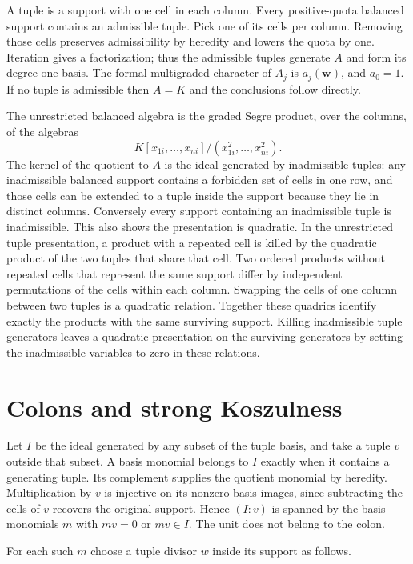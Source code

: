 \documentclass[11pt]{article}
\begin{document}
A tuple is a support with one cell in each column. Every positive-quota balanced support contains an admissible tuple. Pick one of its cells per column. Removing those cells preserves admissibility by heredity and lowers the quota by one. Iteration gives a factorization; thus the admissible tuples generate $A$ and form its degree-one basis. The formal multigraded character of $A_j$ is $a_j(\mathbf w)$, and $a_0=1$. If no tuple is admissible then $A=K$ and the conclusions follow directly.

The unrestricted balanced algebra is the graded Segre product, over the columns, of the algebras
\[
K[x_{1i},\ldots,x_{ni}]/(x_{1i}^2,\ldots,x_{ni}^2).
\] The kernel of the quotient to $A$ is the ideal generated by inadmissible tuples: any inadmissible balanced support contains a forbidden set of cells in one row, and those cells can be extended to a tuple inside the support because they lie in distinct columns. Conversely every support containing an inadmissible tuple is inadmissible. This also shows the presentation is quadratic. In the unrestricted tuple presentation, a product with a repeated cell is killed by the quadratic product of the two tuples that share that cell. Two ordered products without repeated cells that represent the same support differ by independent permutations of the cells within each column. Swapping the cells of one column between two tuples is a quadratic relation. Together these quadrics identify exactly the products with the same surviving support. Killing inadmissible tuple generators leaves a quadratic presentation on the surviving generators by setting the inadmissible variables to zero in these relations.

\section{Colons and strong Koszulness}

Let $I$ be the ideal generated by any subset of the tuple basis, and take a tuple $v$ outside that subset. A basis monomial belongs to $I$ exactly when it contains a generating tuple. Its complement supplies the quotient monomial by heredity. Multiplication by $v$ is injective on its nonzero basis images, since subtracting the cells of $v$ recovers the original support. Hence $(I:v)$ is spanned by the basis monomials $m$ with $mv=0$ or $mv\in I$. The unit does not belong to the colon.

For each such $m$ choose a tuple divisor $w$ inside its support as follows.
\end{document}
